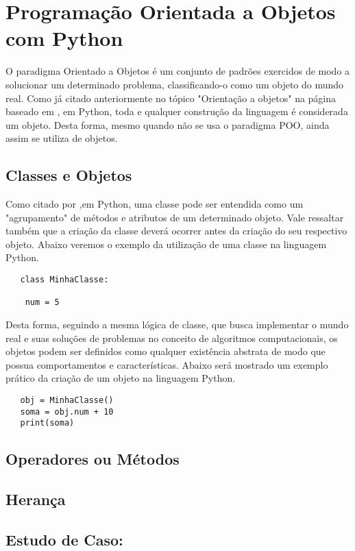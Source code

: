 

\chapter{ Programa\c{c}\~{a}o Orientada a Objetos com Python}
O paradigma Orientado a Objetos é um conjunto de padrões exercidos de modo a solucionar um determinado problema, classificando-o como um objeto do mundo real. Como já citado anteriormente no tópico "Orientação a objetos"  na página \pageref{ling2} baseado em \cite{FBarelli2019} , em Python, toda e qualquer construção da linguagem é considerada um objeto. Desta forma, mesmo quando não se usa o paradigma POO, ainda assim se utiliza de objetos.
    \section{Classes e Objetos}
Como citado por \cite{Perkovic2016},em Python, uma classe pode ser entendida como um "agrupamento" de métodos e atributos de um determinado objeto. Vale ressaltar também que a criação da classe deverá ocorrer antes da criação do seu respectivo objeto. Abaixo veremos o exemplo da utilização de uma classe na linguagem Python.

   \begin{lstlisting}
   class MinhaClasse:
   
    num = 5

    \end{lstlisting}
Desta forma, seguindo a mesma lógica de classe, que busca implementar o mundo real e suas soluções de problemas no conceito de algoritmos computacionais, os objetos podem ser definidos como qualquer existência abstrata de modo que possua comportamentos e características. Abaixo será mostrado um exemplo prático da criação de um objeto na linguagem Python.

   \begin{lstlisting}   	
   obj = MinhaClasse()
   soma = obj.num + 10
   print(soma)

\end{lstlisting}
  
    \section{Operadores ou M\'{e}todos}


    \section{Heran\c{c}a}


    \section{Estudo de Caso: }
